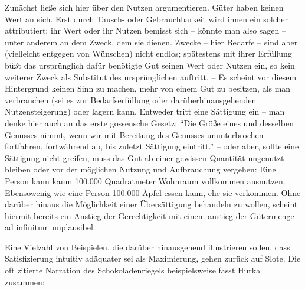 \documentclass[a4paper]{thesis}
\begin{document}
Zunächst ließe sich hier über den Nutzen argumentieren. Güter haben keinen Wert an sich. Erst durch Tausch- oder Gebrauchbarkeit wird ihnen ein solcher attributiert; ihr Wert oder ihr Nutzen bemisst sich -- könnte man also sagen -- unter anderem an dem Zweck, dem sie dienen. Zwecke -- hier Bedarfe -- sind aber (vielleicht entgegen von Wünschen) nicht endlos; spätestens mit ihrer Erfüllung büßt das ursprünglich dafür benötigte Gut seinen Wert oder Nutzen ein, so kein weiterer Zweck als Substitut des ursprünglichen auftritt. -- Es scheint vor diesem Hintergrund keinen Sinn zu machen, mehr von einem Gut zu besitzen, als man verbrauchen (sei es zur Bedarfserfüllung oder darüberhinausgehenden Nutzensteigerung) oder lagern kann. Entweder tritt eine Sättigung ein -- man denke hier auch an das erste gossensche Gesetz: \enquote{Die Größe eines und desselben Genusses nimmt, wenn wir mit Bereitung des Genusses ununterbrochen fortfahren, fortwährend ab, bis zuletzt Sättigung eintritt.} -- oder aber, sollte eine Sättigung nicht greifen, muss das Gut ab einer gewissen Quantität ungenutzt bleiben oder vor der möglichen Nutzung und Aufbrauchung vergehen: Eine Person kann kaum 100.000 Quadratmeter Wohnraum vollkommen ausnutzen. Ebensowenig wie eine Person 100.000 Äpfel essen kann, ehe sie verkommen. Ohne darüber hinaus die Möglichkeit einer Übersättigung behandeln zu wollen, scheint hiermit bereits ein Anstieg der Gerechtigkeit mit einem anstieg der Gütermenge ad infinitum unplausibel.

Eine Vielzahl von Beispielen, die darüber hinausgehend illustrieren sollen, dass Satisfizierung intuitiv adäquater sei als Maximierung, gehen zurück auf Slote. Die oft zitierte Narration des Schokoladenriegels beispielsweise fasst Hurka zusammen:
\end{document}
